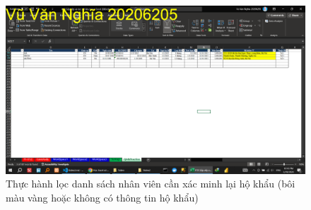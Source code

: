 \documentclass{article}
\begin{document}
\begin{figure}[h]
\centering
\includegraphics[scale = 0.15]{Video2/ThucHanh/6.png}
\caption{Thực hành lọc danh sách nhân viên cần xác minh lại hộ khẩu (bôi màu vàng hoặc không có thông tin hộ khẩu)}
\end{figure}
\end{document}
